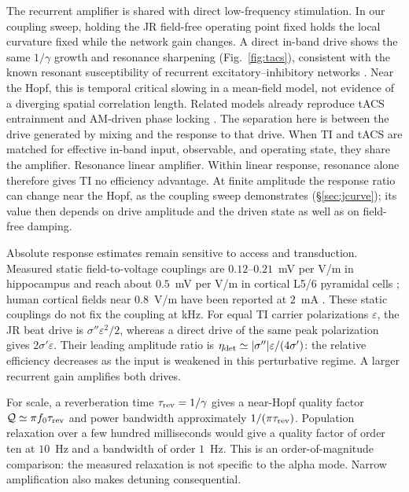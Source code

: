 \documentclass[11pt,a4paper]{article}
\newcommand{\Sig}{\sigma}
\providecommand{\DIFaddtex}[1]{{\protect\color{blue} \sf #1}} %
\providecommand{\DIFdeltex}[1]{{\protect\color{red} \scriptsize #1}} %
\providecommand{\DIFaddbegin}{} %
\providecommand{\DIFaddend}{} %
\providecommand{\DIFdelbegin}{} %
\providecommand{\DIFdelend}{} %
\providecommand{\DIFadd}[1]{\texorpdfstring{\DIFaddtex{#1}}{#1}} %
\providecommand{\DIFdel}[1]{\texorpdfstring{\DIFdeltex{#1}}{}} %
\begin{document}
The recurrent amplifier is shared with direct low-frequency stimulation. In our
coupling sweep, holding the JR \DIFaddbegin \DIFadd{field-free }\DIFaddend operating point fixed holds the local curvature
fixed while the network gain changes. A direct in-band drive shows the same
$1/\gamma$ growth and resonance sharpening (Fig.~\ref{fig:tacs}), consistent with
the known resonant susceptibility of recurrent excitatory--inhibitory networks
\cite{ledoux2011,clusella2023}. Near the Hopf, this is temporal critical slowing
in a mean-field model, not evidence of a diverging spatial correlation length.
Related models already reproduce tACS entrainment and AM-driven phase locking
\cite{ali2013,negahbani2018,krause2023}. The separation here is between the drive
generated by mixing and the response to that drive. When TI and tACS are matched
for effective in-band input, observable, and operating state, they share the
\DIFdelbegin \DIFdel{amplifier. Resonance }\DIFdelend \DIFaddbegin \DIFadd{linear amplifier. Within linear response, resonance }\DIFaddend alone therefore gives TI
no efficiency advantage. \DIFaddbegin \DIFadd{At finite amplitude the response ratio can change near
the Hopf, as the coupling sweep demonstrates (\S\ref{sec:jcurve}); its value then
depends on drive amplitude and the driven state as well as on field-free damping.
}\DIFaddend

Absolute response estimates remain sensitive to access and transduction.
Measured static field-to-voltage couplings are $0.12$--$0.21$~mV per V/m in
hippocampus \cite{bikson2004,deans2007} and reach about $0.5$~mV per V/m in cortical
L5/6 pyramidal cells \cite{radman2009}; human cortical fields near $0.8$~V/m have
been reported at $2$~mA \cite{huang2017,huang2017corr}. These static couplings do
not fix the coupling at kHz. For equal TI carrier polarizations $\varepsilon$,
the JR beat drive is $\Sig''\varepsilon^2/2$, whereas a direct drive of the same
peak polarization gives $2\Sig'\varepsilon$. Their leading amplitude ratio is
$\eta_{\rm det}\simeq|\Sig''|\varepsilon/(4\Sig')$: the relative efficiency decreases
as the input is weakened in this perturbative regime. A larger recurrent gain
amplifies both drives.

For scale, a reverberation time $\tau_{\rm rev}=1/\gamma$ gives a near-Hopf
quality factor $\mathcal Q\simeq\pi f_0\tau_{\rm rev}$ and power bandwidth
approximately $1/(\pi\tau_{\rm rev})$. Population relaxation over a few hundred
milliseconds \cite{wilting2018} would give a quality factor of order ten at
$10$~Hz and a bandwidth of order $1$~Hz. This is an order-of-magnitude comparison:
the measured relaxation is not specific to the alpha mode. Narrow amplification
also makes detuning consequential.
\end{document}
